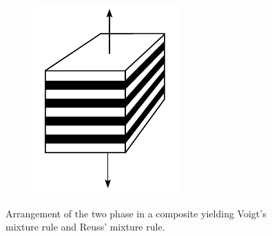 \begin{figure}[hbtp]
\begin{subfigure}[b]{0.35\textwidth}
            \includegraphics[width=\textwidth]{figures/reuss_mixture_rule}
            \caption{}
            \label{subfig:reuss_mixture_rule}
    \end{subfigure}
  \caption{Arrangement of the two phase in a composite yielding  Voigt's mixture rule and  Reuss' mixture rule.}
\label{fig:mixture_rules}
\end{figure}

